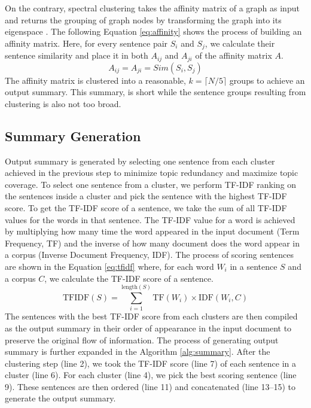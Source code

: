 \documentclass[acmlarge]{acmart}
\begin{document}
On the contrary, spectral clustering takes the affinity matrix of a graph as input and returns the grouping of graph nodes by transforming the graph into its eigenspace \cite{vonLuxburg-2007-spectral-tutorial}. The following Equation \ref{eq:affinity} shows the process of building an affinity matrix. Here, for every sentence pair $S_i$ and $S_j$, we calculate their sentence similarity and place it in both $A_{ij}$ and $A_{ji}$ of the affinity matrix $A$.
\begin{equation}\label{eq:affinity}
	A_{ij}=A_{ji}=Sim(S_i,S_j)
\end{equation}
The affinity matrix is clustered into a reasonable, $k=\lceil N/5 \rceil$ groups to achieve an output summary. This summary, is short while the sentence groups resulting from clustering is also not too broad.
\subsection{Summary Generation}\label{subsec:summary-generation}
Output summary is generated by selecting one sentence from each cluster achieved in the previous step to minimize topic redundancy and maximize topic coverage. To select one sentence from a cluster, we perform TF-IDF ranking on the sentences inside a cluster and pick the sentence with the highest TF-IDF score. To get the TF-IDF score of a sentence, we take the sum of all TF-IDF values for the words in that sentence. The TF-IDF value for a word is achieved by multiplying how many time the word appeared in the input document (Term Frequency, TF) and the inverse of how many document does the word appear in a corpus (Inverse Document Frequency, IDF). The process of scoring sentences are shown in the Equation \ref{eq:tfidf} where, for each word $W_i$ in a sentence $S$ and a corpus $C$, we calculate the TF-IDF score of a sentence.
\begin{equation}\label{eq:tfidf}
	\text{TFIDF}(S) = \sum_{i=1}^{\text{length}(S)}\text{TF}(W_i) \times \text{IDF}(W_i,C)	
\end{equation}
The sentences with the best TF-IDF score from each clusters are then compiled as the output summary in their order of appearance in the input document to preserve the original flow of information. The process of generating output summary is further expanded in the Algorithm \ref{alg:summary}. After the clustering step (line 2), we took the TF-IDF score (line 7) of each sentence in a cluster (line 6). For each cluster (line 4), we pick the best scoring sentence (line 9). These sentences are then ordered (line 11) and concatenated (line 13--15) to generate the output summary.
\end{document}
